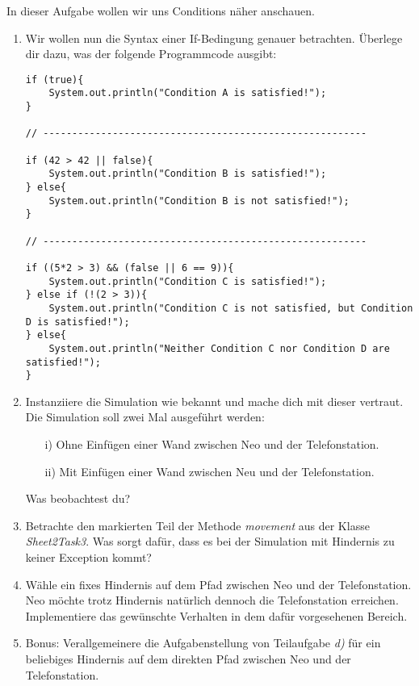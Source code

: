 In dieser Aufgabe wollen wir uns Conditions näher anschauen.
\begin{enumerate}[label=\alph*)]
    \item Wir wollen nun die Syntax einer If-Bedingung genauer betrachten. Überlege dir dazu, was der folgende Programmcode ausgibt:
    \begin{lstlisting}[breaklines=true]
if (true){
    System.out.println("Condition A is satisfied!");
}
    
// --------------------------------------------------------
    
if (42 > 42 || false){
    System.out.println("Condition B is satisfied!");
} else{
    System.out.println("Condition B is not satisfied!");
}
        
// --------------------------------------------------------
        
if ((5*2 > 3) && (false || 6 == 9)){
    System.out.println("Condition C is satisfied!");
} else if (!(2 > 3)){
    System.out.println("Condition C is not satisfied, but Condition D is satisfied!");
} else{
    System.out.println("Neither Condition C nor Condition D are satisfied!");
}
    \end{lstlisting}
                            
    \item Instanziiere die Simulation wie bekannt und mache dich mit dieser vertraut. Die Simulation soll zwei Mal ausgeführt werden:
    \begin{enumerate}
        \item[i)] Ohne Einfügen einer Wand zwischen Neo und der Telefonstation.
        \item[ii)] Mit Einfügen einer Wand zwischen Neu und der Telefonstation. 
    \end{enumerate}
    Was beobachtest du?
    \item Betrachte den markierten Teil der Methode \textit{movement} aus der Klasse \textit{Sheet2Task3}. Was sorgt dafür, dass es bei der Simulation 
    mit Hindernis zu keiner Exception kommt?
    \item Wähle ein fixes Hindernis auf dem Pfad zwischen Neo und der Telefonstation. Neo möchte trotz Hindernis natürlich dennoch die Telefonstation erreichen.
    Implementiere das gewünschte Verhalten in dem dafür vorgesehenen Bereich.
    \item Bonus: Verallgemeinere die Aufgabenstellung von Teilaufgabe \textit{d)} für ein beliebiges Hindernis auf dem direkten Pfad zwischen Neo und der Telefonstation.
\end{enumerate}
